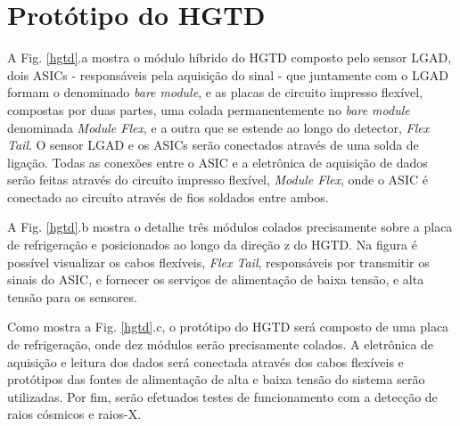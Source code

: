 \section{Protótipo do HGTD}

A Fig. \ref{hgtd}.a mostra o módulo híbrido do HGTD composto pelo sensor LGAD, dois ASICs - responsáveis pela aquisição do sinal - que juntamente com o LGAD formam o denominado \textit{bare module}, e as placas de circuito impresso flexível, compostas por duas partes, uma colada permanentemente no \textit{bare module} denominada \textit{Module Flex}, e a outra que se estende ao longo do detector, \textit{Flex Tail}. O sensor LGAD e os ASICs serão conectados através de uma solda de ligação. Todas as conexões entre o ASIC e a eletrônica de aquisição de dados serão feitas através do circuíto impresso flexível, \textit{Module Flex}, onde o ASIC é conectado ao circuíto através de fios soldados entre ambos.    

A Fig. \ref{hgtd}.b mostra o detalhe três módulos colados precisamente sobre a placa de refrigeração e posicionados ao longo da direção z do HGTD. Na figura é possível visualizar os cabos flexíveis, \textit{Flex Tail}, responsáveis por transmitir os sinais do ASIC, e fornecer os serviços de alimentação de baixa tensão, e alta tensão para os sensores. 

Como mostra a Fig. \ref{hgtd}.c, o protótipo do HGTD será composto de uma placa de refrigeração, onde dez módulos serão precisamente colados. A eletrônica de aquisição e leitura dos dados será conectada através dos cabos flexíveis e protótipos das fontes de alimentação de alta e baixa tensão do sistema serão utilizadas. Por fim, serão efetuados testes de funcionamento com a detecção de raios cósmicos e raios-X.    

